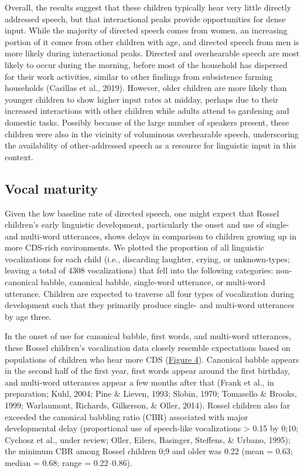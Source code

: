 \documentclass[,man,floatsintext]{apa6}
\begin{document}
Overall, the results suggest that these children typically hear very
little directly addressed speech, but that interactional peaks provide
opportunities for dense input. While the majority of directed speech
comes from women, an increasing portion of it comes from other children
with age, and directed speech from men is more likely during
interactional peaks. Directed and overhearable speech are most likely to
occur during the morning, before most of the household has dispersed for
their work activities, similar to other findings from subsistence
farming households (Casillas et al., 2019). However, older children are
more likely than younger children to show higher input rates at midday,
perhaps due to their increased interactions with other children while
adults attend to gardening and domestic tasks. Possibly because of the
large number of speakers present, these children were also in the
vicinity of voluminous overhearable speech, underscoring the
availability of other-addressed speech as a resource for linguistic
input in this context.

\subsection{Vocal maturity}\label{vocal-maturity}

Given the low baseline rate of directed speech, one might expect that
Rossel children's early linguistic development, particularly the onset
and use of single- and multi-word utterances, shows delays in comparison
to children growing up in more CDS-rich environments. We plotted the
proportion of all linguistic vocalizations for each child (i.e.,
discarding laughter, crying, or unknown-types; leaving a total of 4308
vocalizations) that fell into the following categories: non-canonical
babble, canonical babble, single-word utterance, or multi-word
utterance. Children are expected to traverse all four types of
vocalization during development such that they primarily produce single-
and multi-word utterances by age three.

In the onset of use for canonical babble, first words, and multi-word
utterances, these Rossel children's vocalization data closely resemble
expectations based on populations of children who hear more CDS
(\protect\hyperlink{fig4}{Figure 4}). Canonical babble appears in the
second half of the first year, first words appear around the first
birthday, and multi-word utterances appear a few months after that
(Frank et al., in preparation; Kuhl, 2004; Pine \& Lieven, 1993; Slobin,
1970; Tomasello \& Brooks, 1999; Warlaumont, Richards, Gilkerson, \&
Oller, 2014). Rossel children also far exceeded the canonical babbling
ratio (CBR) associated with major developmental delay (proportional use
of speech-like vocalizations \textgreater{} 0.15 by 0;10; Cychosz et
al., under review; Oller, Eilers, Basinger, Steffens, \& Urbano, 1995);
the minimum CBR among Rossel children 0;9 and older was 0.22 (mean =
0.63; median = 0.68; range = 0.22--0.86).
\end{document}
